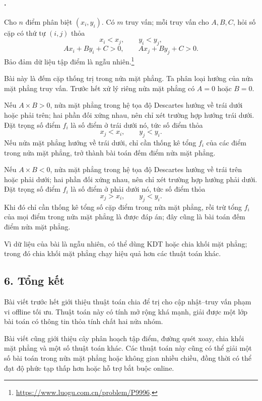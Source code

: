 \documentclass[11pt]{article}
\begin{document}
\paragraph{.}

Cho \(n\) điểm phân biệt \((x_i,y_i)\). Có \(m\) truy vấn; mỗi truy vấn cho
\(A,B,C\), hỏi số cặp có thứ tự \((i,j)\) thỏa
\[
  x_i<x_j,\qquad y_i<y_j,
\]
\[
  Ax_i+By_i+C>0,\qquad Ax_j+By_j+C>0.
\]
Bảo đảm dữ liệu tập điểm là ngẫu nhiên.\footnote{\url{https://www.luogu.com.cn/problem/P9996}.}

Bài này là đếm cặp thống trị trong nửa mặt phẳng. Ta phân loại hướng của nửa
mặt phẳng truy vấn. Trước hết xử lý riêng nửa mặt phẳng có \(A=0\) hoặc
\(B=0\).

Nếu \(A\times B>0\), nửa mặt phẳng trong hệ tọa độ Descartes hướng về trái
dưới hoặc phải trên; hai phần đối xứng nhau, nên chỉ xét trường hợp hướng trái
dưới. Đặt trọng số điểm \(f_i\) là số điểm ở trái dưới nó, tức số điểm thỏa
\[
  x_j<x_i,\qquad y_j<y_i.
\]
Nếu nửa mặt phẳng hướng về trái dưới, chỉ cần thống kê tổng \(f_i\) của các
điểm trong nửa mặt phẳng, trở thành bài toán đếm điểm nửa mặt phẳng.

Nếu \(A\times B<0\), nửa mặt phẳng trong hệ tọa độ Descartes hướng về trái
trên hoặc phải dưới; hai phần đối xứng nhau, nên chỉ xét trường hợp hướng phải
dưới. Đặt trọng số điểm \(f_i\) là số điểm ở phải dưới nó, tức số điểm thỏa
\[
  x_j>x_i,\qquad y_j<y_i.
\]
Khi đó chỉ cần thống kê tổng số cặp điểm trong nửa mặt phẳng, rồi trừ tổng
\(f_i\) của mọi điểm trong nửa mặt phẳng là được đáp án; đây cũng là bài toán
đếm điểm nửa mặt phẳng.

Vì dữ liệu của bài là ngẫu nhiên, có thể dùng KDT hoặc chia khối mặt phẳng;
trong đó chia khối mặt phẳng chạy hiệu quả hơn các thuật toán khác.

\subsection*{6. Tổng kết}

Bài viết trước hết giới thiệu thuật toán chia để trị cho cập nhật--truy vấn
phạm vi offline tối ưu. Thuật toán này có tính mở rộng khá mạnh, giải được một
lớp bài toán có thông tin thỏa tính chất hai nửa nhóm.

Bài viết cũng giới thiệu cây phân hoạch tập điểm, đường quét xoay, chia khối
mặt phẳng và một số thuật toán khác. Các thuật toán này cũng có thể giải một số
bài toán trong nửa mặt phẳng hoặc không gian nhiều chiều, đồng thời có thể đạt
độ phức tạp thấp hơn hoặc hỗ trợ bắt buộc online.
\end{document}
